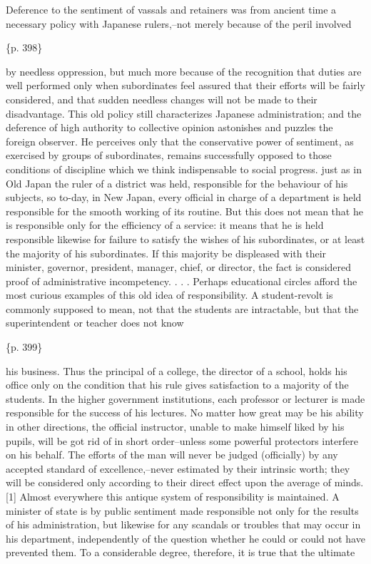 Deference to the sentiment of vassals and retainers was from ancient time a necessary policy with Japanese rulers,--not merely because of the peril involved

\{p. 398\}

by needless oppression, but much more because of the recognition that duties are well performed only when subordinates feel assured that their efforts will be fairly considered, and that sudden needless changes will not be made to their disadvantage. This old policy still characterizes Japanese administration; and the deference of high authority to collective opinion astonishes and puzzles the foreign observer. He perceives only that the conservative power of sentiment, as exercised by groups of subordinates, remains successfully opposed to those conditions of discipline which we think indispensable to social progress. just as in Old Japan the ruler of a district was held, responsible for the behaviour of his subjects, so to-day, in New Japan, every official in charge of a department is held responsible for the smooth working of its routine. But this does not mean that he is responsible only for the efficiency of a service: it means that he is held responsible likewise for failure to satisfy the wishes of his subordinates, or at least the majority of his subordinates. If this majority be displeased with their minister, governor, president, manager, chief, or director, the fact is considered proof of administrative incompetency. . . . Perhaps educational circles afford the most curious examples of this old idea of responsibility. A student-revolt is commonly supposed to mean, not that the students are intractable, but that the superintendent or teacher does not know

\{p. 399\}

his business. Thus the principal of a college, the director of a school, holds his office only on the condition that his rule gives satisfaction to a majority of the students. In the higher government institutions, each professor or lecturer is made responsible for the success of his lectures. No matter how great may be his ability in other directions, the official instructor, unable to make himself liked by his pupils, will be got rid of in short order--unless some powerful protectors interfere on his behalf. The efforts of the man will never be judged (officially) by any accepted standard of excellence,--never estimated by their intrinsic worth; they will be considered only according to their direct effect upon the average of minds.[1] Almost everywhere this antique system of responsibility is maintained. A minister of state is by public sentiment made responsible not only for the results of his administration, but likewise for any scandals or troubles that may occur in his department, independently of the question whether he could or could not have prevented them. To a considerable degree, therefore, it is true that the ultimate

